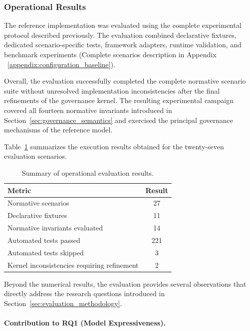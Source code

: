 \documentclass[10pt]{article}
\begin{document}
\subsubsection{Operational Results}
\label{subsubsec:operational_results}

The reference implementation was evaluated using the complete experimental
protocol described previously. The evaluation combined declarative fixtures,
dedicated scenario-specific tests, framework adapters, runtime validation, and
benchmark experiments (Complete scenarios description in Appendix ~\ref{appendix:configuration_baseline}).

Overall, the evaluation successfully completed the complete normative scenario
suite without unresolved implementation inconsistencies after the final
refinements of the governance kernel. The resulting experimental campaign
covered all fourteen normative invariants introduced in
Section~\ref{sec:governance_semantics} and exercised the principal governance
mechanisms of the reference model.

Table~\ref{tab:scenario_results} summarizes the execution results obtained for
the twenty-seven evaluation scenarios.

\begin{table}[t]
\caption{Summary of operational evaluation results.}
\label{tab:scenario_results}
\centering
\begin{tabular}{lc}
\hline
Metric & Result\\
\hline
Normative scenarios & 27\\
Declarative fixtures & 11\\
Normative invariants evaluated & 14\\
Automated tests passed & 221\\
Automated tests skipped & 3\\
Kernel inconsistencies requiring refinement & 2\\
\hline
\end{tabular}
\end{table}

Beyond the numerical results, the evaluation provides several observations that
directly address the research questions introduced in
Section~\ref{sec:evaluation_methodology}.

\paragraph{Contribution to RQ1 (Model Expressiveness).}
\end{document}
